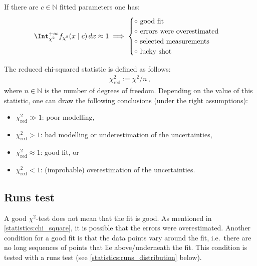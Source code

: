     \begin{property}\label{statistics:chi_square}
        If there are $c\in\mathbb{N}$ fitted parameters one has:
        \begin{gather}
            \Int_{\chi^2}^{+\infty}f_{\chi^2}(x\mid c)\,dx\approx 1\implies
            \begin{cases}
                \circ\text{  good fit}\\
                \circ\text{  errors were overestimated}\\
                \circ\text{  selected measurements}\\
                \circ\text{  lucky shot}
            \end{cases}
        \end{gather}
    \end{property}
    \begin{property}
        The reduced chi-squared statistic is defined as follows:
        \begin{gather}
            \chi^2_{\text{red}} := \chi^2/n\,,
        \end{gather}
        where $n\in\mathbb{N}$ is the number of degrees of freedom. Depending on the value of this statistic, one can draw the following conclusions (under the right assumptions):
        \begin{itemize}
            \item $\chi^2_{\text{red}}\gg1$: poor modelling,
            \item $\chi^2_{\text{red}}>1$: bad modelling or underestimation of the uncertainties,
            \item $\chi^2_{\text{red}}\approx1$: good fit, or
            \item $\chi^2_{\text{red}}<1$: (improbable) overestimation of the uncertainties.
        \end{itemize}
    \end{property}

\subsection{Runs test}

    A good $\chi^2$-test does not mean that the fit is good. As mentioned in \cref{statistics:chi_square}, it is possible that the errors were overestimated. Another condition for a good fit is that the data points vary around the fit, i.e.~there are no long sequences of points that lie above/underneath the fit. This condition is tested with a runs test (see \cref{statistics:runs_distribution} below).

